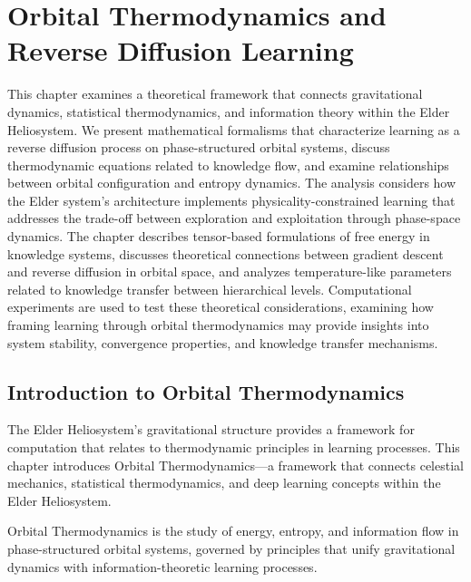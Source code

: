\chapter{Orbital Thermodynamics and Reverse Diffusion Learning}

\begin{tcolorbox}[colback=blue!5!white,colframe=blue!75!black,title=Chapter Summary]
This chapter examines a theoretical framework that connects gravitational dynamics, statistical thermodynamics, and information theory within the Elder Heliosystem. We present mathematical formalisms that characterize learning as a reverse diffusion process on phase-structured orbital systems, discuss thermodynamic equations related to knowledge flow, and examine relationships between orbital configuration and entropy dynamics. The analysis considers how the Elder system's architecture implements physicality-constrained learning that addresses the trade-off between exploration and exploitation through phase-space dynamics. The chapter describes tensor-based formulations of free energy in knowledge systems, discusses theoretical connections between gradient descent and reverse diffusion in orbital space, and analyzes temperature-like parameters related to knowledge transfer between hierarchical levels. Computational experiments are used to test these theoretical considerations, examining how framing learning through orbital thermodynamics may provide insights into system stability, convergence properties, and knowledge transfer mechanisms.
\end{tcolorbox}

\section{Introduction to Orbital Thermodynamics}

The Elder Heliosystem's gravitational structure provides a framework for computation that relates to thermodynamic principles in learning processes. This chapter introduces Orbital Thermodynamics—a framework that connects celestial mechanics, statistical thermodynamics, and deep learning concepts within the Elder Heliosystem.

\begin{definition}
Orbital Thermodynamics is the study of energy, entropy, and information flow in phase-structured orbital systems, governed by principles that unify gravitational dynamics with information-theoretic learning processes.
\end{definition}

